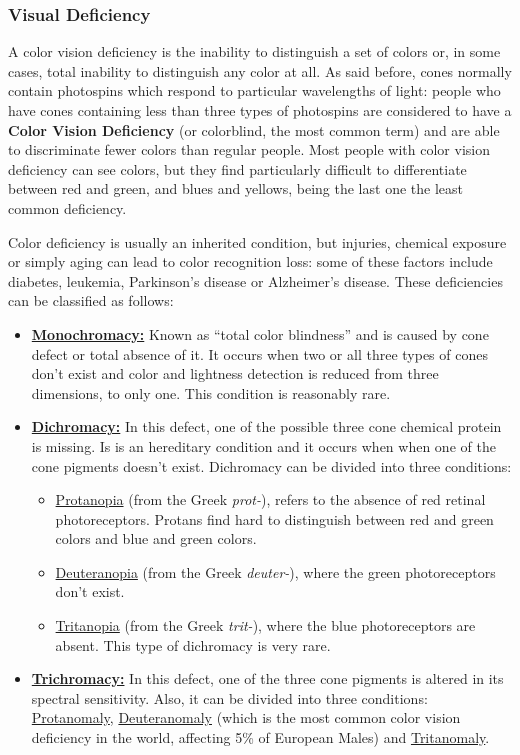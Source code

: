 \subsubsection{Visual Deficiency}
\label{subsubsec:visual_deficiencies}
%
A color vision deficiency is the inability to distinguish a set of colors or, in some cases, total
inability to distinguish any color at all. As said before, cones normally contain photospins which respond
to particular wavelengths of light: people who have cones containing less than three types of photospins are considered to have a \textbf{Color Vision Deficiency} (or colorblind, the most common term)
and are able to discriminate fewer colors than regular people. Most people with color vision deficiency can
see colors, but they find particularly difficult to differentiate between red and green, and blues and
yellows, being the last one the least common deficiency. \par
Color deficiency is usually an inherited condition, but injuries, chemical exposure or simply aging can lead to color
recognition loss: some of these factors include diabetes, leukemia, Parkinson’s disease or Alzheimer’s
disease. These deficiencies can be classified as follows:
%
\begin{itemize}
\item \textbf{\underline{Monochromacy:}} Known as “total color blindness” and is caused by cone defect or
total absence of it. It occurs when two or all three types of cones don’t exist and color and lightness
detection is reduced from three dimensions, to only one. This condition is reasonably rare.
\item \textbf{\underline{Dichromacy:}} In this defect, one of the possible three cone chemical protein is
missing. Is is an hereditary condition and it occurs when when one of the cone pigments doesn’t exist.
Dichromacy can be divided into three conditions:
	\begin{itemize}
	\item \underline{Protanopia} (from the Greek \emph{prot-}), refers to the absence of red retinal
    photoreceptors.
    Protans find hard to distinguish between red and green colors and blue and green colors.
    \item \underline{Deuteranopia} (from the Greek \emph{deuter-}), where the green photoreceptors don’t
    exist.
    \item \underline{Tritanopia} (from the Greek \emph{trit-}), where the blue photoreceptors are absent.
    This type of dichromacy is very rare.
	\end{itemize}
\item \textbf{\underline{Trichromacy:}} In this defect, one of the three cone pigments is altered in its
spectral sensitivity. Also, it can be divided into three conditions: \underline{Protanomaly}, \underline{Deuteranomaly} (which is the most common color vision deficiency in the world, affecting 5\% of European Males) and \underline{Tritanomaly}.
\end{itemize} \par
